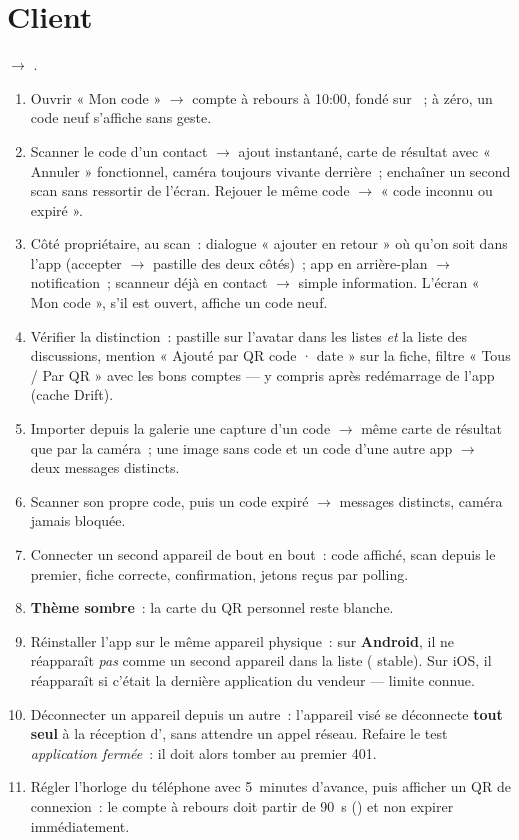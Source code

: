 \section{Client}

 $\rightarrow$ .

\begin{enumerate}[leftmargin=1.6em]
  \item Ouvrir « Mon code » $\rightarrow$ compte à rebours à 10:00, fondé sur
        ~; à zéro, un code neuf s'affiche sans geste.
  \item Scanner le code d'un contact $\rightarrow$ ajout instantané, carte de résultat
        avec « Annuler » fonctionnel, caméra toujours vivante derrière~; enchaîner un
        second scan sans ressortir de l'écran. Rejouer le même code $\rightarrow$
        « code inconnu ou expiré ».
  \item Côté propriétaire, au scan~: dialogue « ajouter en retour » où qu'on soit dans
        l'app (accepter $\rightarrow$ pastille des deux côtés)~; app en arrière-plan
        $\rightarrow$ notification~; scanneur déjà en contact $\rightarrow$ simple
        information. L'écran « Mon code », s'il est ouvert, affiche un code neuf.
  \item Vérifier la distinction~: pastille sur l'avatar dans les listes \emph{et} la
        liste des discussions, mention « Ajouté par QR code · date » sur la fiche,
        filtre « Tous / Par QR » avec les bons comptes --- y compris après redémarrage
        de l'app (cache Drift).
  \item Importer depuis la galerie une capture d'un code $\rightarrow$ même carte de
        résultat que par la caméra~; une image sans code et un code d'une autre app
        $\rightarrow$ deux messages distincts.
  \item Scanner son propre code, puis un code expiré $\rightarrow$ messages distincts,
        caméra jamais bloquée.
  \item Connecter un second appareil de bout en bout~: code affiché, scan depuis le
        premier, fiche correcte, confirmation, jetons reçus par polling.
  \item \textbf{Thème sombre}~: la carte du QR personnel reste blanche.
  \item Réinstaller l'app sur le même appareil physique~: sur \textbf{Android}, il ne
        réapparaît \emph{pas} comme un second appareil dans la liste (
        stable). Sur iOS, il réapparaît si c'était la dernière application du vendeur ---
        limite connue.
  \item Déconnecter un appareil depuis un autre~: l'appareil visé se déconnecte
        \textbf{tout seul} à la réception d', sans attendre un
        appel réseau. Refaire le test \emph{application fermée}~: il doit alors tomber au
        premier 401.
  \item Régler l'horloge du téléphone avec 5~minutes d'avance, puis afficher un QR de
        connexion~: le compte à rebours doit partir de 90~s () et non expirer
        immédiatement.
\end{enumerate}

